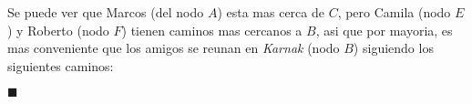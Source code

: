 \documentclass[legalpaper,10pt]{article}
\begin{document}
\begin{enumerate}
\begin{enumerate}
  Se puede ver que Marcos (del nodo $A$) esta mas cerca de $C$, pero Camila (nodo $E$) y Roberto (nodo $F$) tienen caminos mas cercanos a $B$, asi que por mayoria, es mas conveniente que los amigos se reunan en \textit{Karnak} (nodo $B$) siguiendo los siguientes caminos:

  \hfill \(\blacksquare\)

  \newpage



\end{enumerate}

\end{enumerate}
\end{document}
